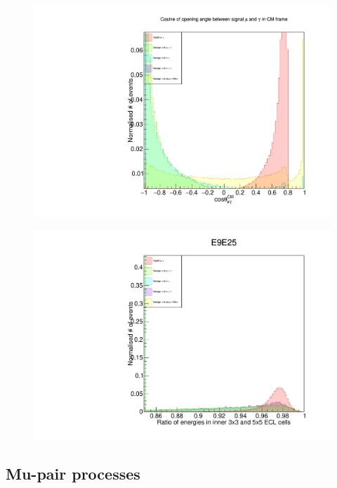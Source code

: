 \documentclass[12pt]{thesis}  %
\begin{document}
\begin{figure}[h]
\centering
\begin{minipage}{.5\textwidth}
  \centering
  \includegraphics[width=\linewidth]{images/taupair-muGammaOpeningCM.pdf}
  \label{fig:test1}
\end{minipage}%
\begin{minipage}{.5\textwidth}
  \centering
  \includegraphics[width=\linewidth]{images/taupair-e9e25.pdf}
  \label{fig:test2}
\end{minipage}
\end{figure}


\subsection{Mu-pair processes}
\end{document}
